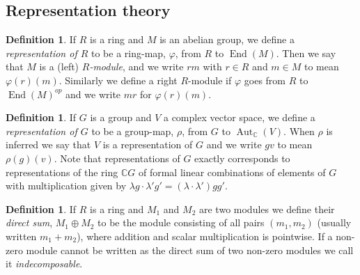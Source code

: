 \documentclass[11pt, a4paper, english]{article}
\theoremstyle{definition}
\newtheorem{defin}[theorem]{Definition}
\newcommand{\C}{\mathbb{C}}
\DeclareMathOperator{\End}{End}
\DeclareMathOperator{\Aut}{Aut}
\begin{document}
\begin{appendices}
\section{Representation theory}
\label{appendix}

\begin{defin}
If $R$ is a ring and $M$ is an abelian group, we define a \textit{representation of $R$} to be a ring-map, $\varphi$, from $R$ to $\End(M)$. Then we say that $M$ is a (left) \textit{$R$-module}, and we write $rm$ with $r \in R$ and $m \in M$ to mean $\varphi(r)(m)$. Similarly we define a right $R$-module if $\varphi$ goes from $R$ to $\End(M)^{op}$ and we write $mr$ for $\varphi(r)(m)$.
\end{defin}

\begin{defin}
If $G$ is a group and $V$ a complex vector space, we define a \textit{representation of $G$} to be a group-map, $\rho$, from $G$ to $\Aut_\C(V)$. When $\rho$ is inferred we say that $V$ is a representation of $G$ and we write $gv$ to mean $\rho(g)(v)$. Note that representations of $G$ exactly corresponds to representations of the ring $\C G$ of formal linear combinations of elements of $G$ with multiplication given by $\lambda g \cdot \lambda' g' = (\lambda \cdot \lambda')gg'$.
\end{defin}

\begin{defin}
\label{def:indecomposable}
If $R$ is a ring and $M_1$ and $M_2$ are two modules we define their \textit{direct sum}, $M_1 \oplus M_2$ to be the module consisting of all pairs $(m_1, m_2)$ (usually written $m_1 + m_2$), where addition and scalar multiplication is pointwise. If a non-zero module cannot be written as the direct sum of two non-zero modules we call it \textit{indecomposable}.
\end{defin}


\end{appendices}
\end{document}
